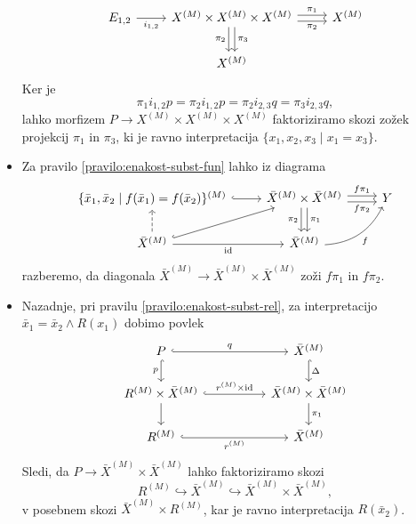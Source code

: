 \documentclass[../kategoricna_logika.tex]{subfiles}
\begin{document}
\begin{dokaz}
\begin{itemize}
\begin{equation*}
\begin{tikzcd}
        E_{1,2} \ar[r, "i_{1,2}"'] & X^{(M)} \times X^{(M)} \times
        X^{(M)} \ar[d, shift left, "\pi_3"] \ar[d, shift right,
        "\pi_2"'] \ar[r, shift left, "\pi_1"]
        \ar[r, shift right, "\pi_2"'] & X^{(M)} \\
        & X^{(M)}
      \end{tikzcd}
    \end{equation*}
    Ker je
    \[ \pi_1 i_{1,2}p = \pi_2 i_{1,2}p = \pi_2i_{2,3}q =
      \pi_3i_{2,3}q,\] lahko morfizem
    $P \to X^{(M)} \times X^{(M)} \times X^{(M)}$ faktoriziramo skozi
    zožek projekcij $\pi_1$ in $\pi_3$, ki je ravno interpretacija
    $\{x_1, x_2, x_3 \mid x_1 = x_3\}$.
  \item Za pravilo \ref{pravilo:enakost-subst-fun} lahko iz diagrama
    \begin{equation*}
      \begin{tikzcd}
        \{\bar{x}_1, \bar{x}_2 \mid f(\bar{x}_1) =
        f(\bar{x}_2)\}^{(M)} \ar[r, hook] & \bar{X}^{(M)} \times
        \bar{X}^{(M)} \ar[r, shift left, "f \pi_1"] \ar[r, shift
        right, "f \pi_2"']
        \ar[d, shift left, "\pi_1"] \ar[d, shift right, "\pi_2"'] & Y \\
        \bar{X}^{(M)} \ar[u, dashed] \ar[ur, hook] \ar[r, "
        \mathrm{id}"'] & \bar{X}^{(M)} \ar[ur, bend right, "f"']
      \end{tikzcd}
    \end{equation*}
    razberemo, da diagonala
    $\bar{X}^{(M)} \to \bar{X}^{(M)} \times \bar{X}^{(M)}$ zoži
    $f \pi_1$ in $f \pi_2$.
  \item Nazadnje, pri pravilu \ref{pravilo:enakost-subst-rel}, za
    interpretacijo $\bar{x}_1 = \bar{x}_2 \land R(x_1)$ dobimo povlek
    \begin{equation*}
      \begin{tikzcd}[column sep=5em]
        P \ar[d, hook, "p"'] \ar[r, hook, "q"] & \bar{X}^{(M)} \ar[d, hook, "\Delta"] \\
        R^{(M)} \times \bar{X}^{(M)} \ar[d] \ar[r, hook, "r^{(M)}
        \times \mathrm{id}"] &
        \bar{X}^{(M)} \times \bar{X}^{(M)} \ar[d, "\pi_1"] \\
        R^{(M)} \ar[r, hook, "r^{(M)}"'] & \bar{X}^{(M)}
      \end{tikzcd}
    \end{equation*}
    Sledi, da $P \to \bar{X}^{(M)} \times \bar{X}^{(M)}$ lahko
    faktoriziramo skozi
    \[R^{(M)} \hookrightarrow \bar{X}^{(M)} \hookrightarrow
    \bar{X}^{(M)} \times \bar{X}^{(M)},\]
    v posebnem skozi
    $\bar{X}^{(M)} \times R^{(M)}$, kar je ravno interpretacija
    $R(\bar{x}_2)$.
  \end{itemize}

\end{dokaz}
%
\end{document}
